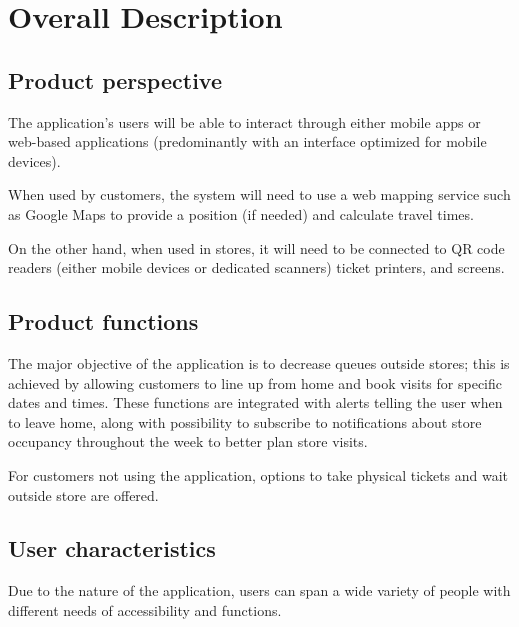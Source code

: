 
\section{Overall Description}
\label{sect:overview}

\subsection{Product perspective}
The application's users will be able to interact through either mobile apps or web-based applications (predominantly with an interface optimized for mobile devices).

When used by customers, the system will need to use a web mapping service such as Google Maps to provide a position (if needed) and calculate travel times.

On the other hand, when used in stores, it will need to be connected to QR code readers (either mobile devices or dedicated scanners) ticket printers, and screens.



\subsection{Product functions}
The major objective of the application is to decrease queues outside stores; this is achieved by allowing customers to line up from home and book visits for specific dates and times. These functions are integrated with alerts telling the user when to leave home, along with possibility to subscribe to notifications about store occupancy throughout the week to better plan store visits.

For customers not using the application, options to take physical tickets and wait outside store are offered.

\subsection{User characteristics}
Due to the nature of the application, users can span a wide variety of people with different needs of accessibility and functions.


